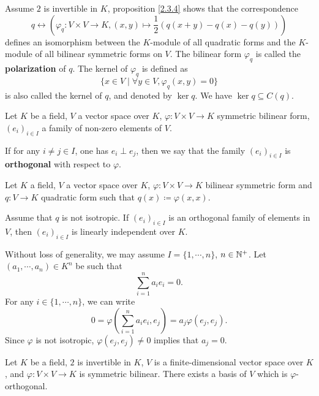 \begin{remark}
    Assume $2$ is invertible in $K$, proposition \ref{2.3.4} shows that the correspondence
    $$ q\leftrightarrow \left(\varphi_q : V\times V\rightarrow K, (x,y) \mapsto \frac{1}{2} \left(q(x+y) - q(x) -q(y)\right)\right)$$
    defines an isomorphism between the $K$-module of all quadratic forms and the $K$-module of all bilinear symmetric forms on $V$. The bilinear form $\varphi_q$ is called the \textbf{polarization} of $q$. The kernel of $\varphi_q$ is defined as
    $$\{x\in V\mid  \forall y\in V, \varphi_q(x,y) = 0\}$$
    is also called the kernel of $q$, and denoted by $\ker q$. We have $\ker q\subseteq C(q)$.
\end{remark}
\begin{definitionenv}
    Let $K$ be a field, $V$ a vector space over $K$, $\varphi:V\times V\rightarrow K$ symmetric bilinear form, $\left(e_i\right)_{i\in I}$ a family of non-zero elements of $V$.
    
    \quad If for any $i\neq j\in I$, one has $e_i\perp e_j$, then we say that the family $\left(e_i\right)_{i\in I}$ is \textbf{orthogonal} with respect to $\varphi$.
\end{definitionenv}
\begin{propositionenv}
    Let $K$ a field, $V$ a vector space over $K$, $\varphi:V\times V\rightarrow K$ bilinear symmetric form and $q: V\rightarrow K$ quadratic form such that $q(x)\coloneq \varphi(x,x)$.

    \quad Assume that $q$ is not isotropic. If $\left(e_i\right)_{i\in I}$ is an orthogonal family of elements in $V$, then $\left(e_i\right)_{i\in I}$ is linearly independent over $K$.
\end{propositionenv}
\begin{proofenv}
    Without loss of generality, we may assume $I=\{1,\cdots,n\}$, $n\in \mathbb{N}^+$. Let $\left(a_1,\cdots,a_n\right)\in K^n$ be such that 
    $$ \sum_{i=1}^{n} a_i e_i = 0.$$
    For any $i\in \{1,\cdots,n\}$, we can write 
    $$0 = \varphi\left(\sum_{i=1}^{n}a_i e_i ,e_j\right) = a_j \varphi(e_j,e_j).$$
    Since $\varphi$ is not isotropic, $\varphi(e_j,e_j)\neq 0 $ implies that $a_j=0$.
\end{proofenv}
\begin{propositionenv}
    Let $K$ be a field, $2$ is invertible in $K$, $V$ is a finite-dimensional vector space over $K$, and $\varphi : V\times V\rightarrow K$ is symmetric bilinear. There exists a basis of $V$ which is $\varphi$-orthogonal.
\end{propositionenv}
